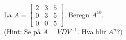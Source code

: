 \begin{oppgave}
La
$A=\begin{bmatrix}
2 & 3 & 5\\
0 & 3 & 5\\
0 & 0 & 5
\end{bmatrix}$. Beregn $A^{10}$. \\[5pt] (Hint: Se på $A=VDV^{-1}$. 
Hva blir $A^n$?)
\end{oppgave}



%
%
%
%
%
%
%


%
%
%
%
%
%
%


